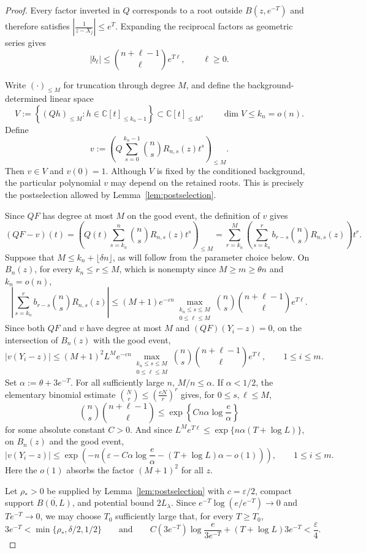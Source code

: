 \documentclass[10pt,a4paper]{amsart}
\newcommand{\C}{\mathbb C}
\begin{document}
\begin{proof}
    Every factor inverted in $Q$ corresponds to a root outside $B(z,e^{-T})$ and therefore satisfies $|\frac{1}{z-X_j}| \le e^T$. Expanding the reciprocal factors as geometric series gives
    \[|b_\ell| \le \binom{n+\ell-1}{\ell}e^{T\ell}, \qquad \ell\ge0.\]
    
    Write $(\cdot)_{\le M}$ for truncation through degree $M$, and define the background-determined linear space
    \[V:=\left\{(Qh)_{\le M}:h\in\C[t]_{\le k_n-1}\right\}
    \subset \C[t]_{\le M},\qquad\dim V\le k_n=o(n).\]
    Define 
    \[v:=\left(Q\sum_{s=0}^{k_n-1}\binom{n}{s}R_{n,s}(z)t^s\right)_{\le M}.\]
    Then $v\in V$ and $v(0)=1$.
    Although $V$ is fixed by the conditioned background, the particular polynomial $v$ may depend on the retained roots. This is precisely the postselection allowed by Lemma~\ref{lem:postselection}.
    
    Since $QF$ has degree at most $M$ on the good event, the definition of $v$ gives
    \[(QF-v)(t)
    =\left(Q(t)\sum_{s=k_n}^{n}\binom nsR_{n,s}(z)t^s\right)_{\le M} 
    =\sum_{r=k_n}^{M}\left(\sum_{s=k_n}^{r}b_{r-s}\binom nsR_{n,s}(z)\right)t^r.\]
    Suppose that $M\le k_n+\lfloor\delta n\rfloor$, as will follow from the parameter choice below. On $B_n(z)$, for every $k_n\le r\le M$, which is nonempty since $M\ge m\ge\theta n$ and $k_n=o(n)$,
    \[\left|\sum_{s=k_n}^{r}b_{r-s}\binom nsR_{n,s}(z)\right|\le(M+1)e^{-\varepsilon n}\max_{\substack{k_n\le s\le M\\0\le\ell\le M}}\binom ns\binom{n+\ell-1}{\ell}e^{T\ell}.\]
    Since both $QF$ and $v$ have degree at most $M$ and $(QF)(Y_i-z)=0$, on the intersection of $B_n(z)$ with the good event,
    \[|v(Y_i-z)|\le(M+1)^2L^M e^{-\varepsilon n}\max_{\substack{k_n\le s\le M\\0\le\ell\le M}}\binom ns\binom{n+\ell-1}{\ell}e^{T\ell},
    \qquad 1\le i\le m.\]
    Set $\alpha:=\theta+3e^{-T}$. For all sufficiently large $n$, $M/n\le\alpha$. If $\alpha<1/2$, the elementary binomial estimate $\binom Nr\le\left(\frac{eN}{r}\right)^r$ gives, for $0\le s,\ell\le M$,
    \[\binom ns\binom{n+\ell-1}{\ell}\le\exp\left\{Cn\alpha\log\frac e\alpha\right\}\]
    for some absolute constant $C>0$. And since $L^Me^{T\ell}\le\exp\{n\alpha(T+\log L)\}$, on $B_n(z)$ and the good event,
    \[|v(Y_i-z)|\le\exp\left(-n\left(\varepsilon-C\alpha\log\frac{e}{\alpha}-(T+\log L)\alpha-o(1)\right)\right),
    \qquad 1\le i\le m.\]
    Here the $o(1)$ absorbs the factor $(M+1)^2$ for all $z$.
    
    Let $\rho_*>0$ be supplied by Lemma~\ref{lem:postselection} with $c=\varepsilon/2$, compact support $\overline{B(0,L)}$, and potential bound $2L_\lambda$. Since $e^{-T}\log(e/e^{-T})\to 0$ and $Te^{-T}\to 0$, we may choose $T_0$ sufficiently large that, for every $T\ge T_0$,
    \[3e^{-T}<\min\{\rho_*,\delta/2,1/2\}
    \qquad\text{and}\qquad
    C(3e^{-T})\log\frac{e}{3e^{-T}}+(T+\log L)3e^{-T}<\frac{\varepsilon}{4}.\]


\end{proof}
\end{document}
